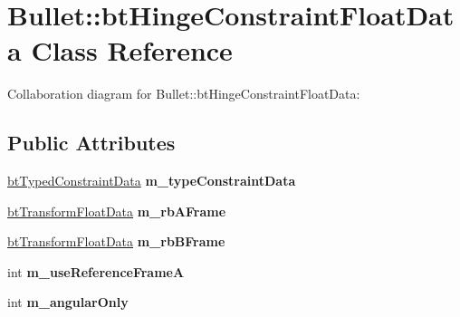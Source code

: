 \hypertarget{class_bullet_1_1bt_hinge_constraint_float_data}{\section{Bullet\+:\+:bt\+Hinge\+Constraint\+Float\+Data Class Reference}
\label{class_bullet_1_1bt_hinge_constraint_float_data}
}


Collaboration diagram for Bullet\+:\+:bt\+Hinge\+Constraint\+Float\+Data\+:
\subsection*{Public Attributes}
\begin{DoxyCompactItemize}
\item 
\hypertarget{class_bullet_1_1bt_hinge_constraint_float_data_a1fcbcddce7c57db5baa354471a1455e9}{\hyperlink{class_bullet_1_1bt_typed_constraint_data}{bt\+Typed\+Constraint\+Data} {\bfseries m\+\_\+type\+Constraint\+Data}}\label{class_bullet_1_1bt_hinge_constraint_float_data_a1fcbcddce7c57db5baa354471a1455e9}

\item 
\hypertarget{class_bullet_1_1bt_hinge_constraint_float_data_a79500075af5f6957492461d890b34c27}{\hyperlink{class_bullet_1_1bt_transform_float_data}{bt\+Transform\+Float\+Data} {\bfseries m\+\_\+rb\+A\+Frame}}\label{class_bullet_1_1bt_hinge_constraint_float_data_a79500075af5f6957492461d890b34c27}

\item 
\hypertarget{class_bullet_1_1bt_hinge_constraint_float_data_aa94a2778534c1dd2218250d8ae2275c8}{\hyperlink{class_bullet_1_1bt_transform_float_data}{bt\+Transform\+Float\+Data} {\bfseries m\+\_\+rb\+B\+Frame}}\label{class_bullet_1_1bt_hinge_constraint_float_data_aa94a2778534c1dd2218250d8ae2275c8}

\item 
\hypertarget{class_bullet_1_1bt_hinge_constraint_float_data_a32ff80d11b0ccecc9c90470538b11e85}{int {\bfseries m\+\_\+use\+Reference\+Frame\+A}}\label{class_bullet_1_1bt_hinge_constraint_float_data_a32ff80d11b0ccecc9c90470538b11e85}

\item 
\hypertarget{class_bullet_1_1bt_hinge_constraint_float_data_a59c2ae2156f63c0962b743cfa2540baf}{int {\bfseries m\+\_\+angular\+Only}}\label{class_bullet_1_1bt_hinge_constraint_float_data_a59c2ae2156f63c0962b743cfa2540baf}


\end{DoxyCompactItemize}
